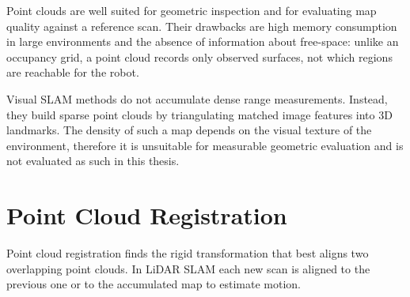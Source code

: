 Point clouds are well suited for geometric inspection and for evaluating map
quality against a reference scan.
Their drawbacks are high memory consumption in large environments and the
absence of information about free-space: unlike an occupancy grid, a point cloud
records only observed surfaces, not which regions are reachable for the robot.

Visual SLAM methods do not accumulate dense range measurements.
Instead, they build sparse point clouds by triangulating matched image
features into 3D landmarks.
The density of such a map depends on the visual texture of the environment,
therefore it is unsuitable for measurable geometric evaluation and 
is not evaluated as such in this thesis.

\section{Point Cloud Registration}

Point cloud registration finds the rigid transformation that best aligns two
overlapping point clouds. In LiDAR SLAM each new scan is aligned to the
previous one or to the accumulated map to estimate motion.

%

